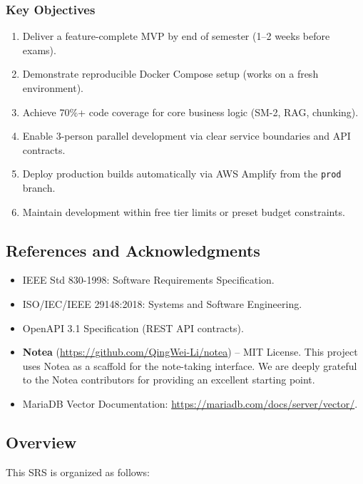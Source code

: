 \documentclass[12pt,a4paper]{article}
\begin{document}
\subsubsection{Key Objectives}

\begin{enumerate}
    \item Deliver a feature-complete MVP by end of semester (1--2 weeks before exams).
    \item Demonstrate reproducible Docker Compose setup (works on a fresh environment).
    \item Achieve 70\%+ code coverage for core business logic (SM-2, RAG, chunking).
    \item Enable 3-person parallel development via clear service boundaries and API contracts.
    \item Deploy production builds automatically via AWS Amplify from the \texttt{prod} branch.
    \item Maintain development within free tier limits or preset budget constraints.
\end{enumerate}

\subsection{References and Acknowledgments}

\begin{itemize}
    \item IEEE Std 830-1998: Software Requirements Specification.
    \item ISO/IEC/IEEE 29148:2018: Systems and Software Engineering.
    \item OpenAPI 3.1 Specification (REST API contracts).
    \item \textbf{Notea} (\url{https://github.com/QingWei-Li/notea}) -- MIT License. This project uses Notea as a scaffold for the note-taking interface. We are deeply grateful to the Notea contributors for providing an excellent starting point.
    \item MariaDB Vector Documentation: \url{https://mariadb.com/docs/server/vector/}.
\end{itemize}

\subsection{Overview}

This SRS is organized as follows:
\end{document}
